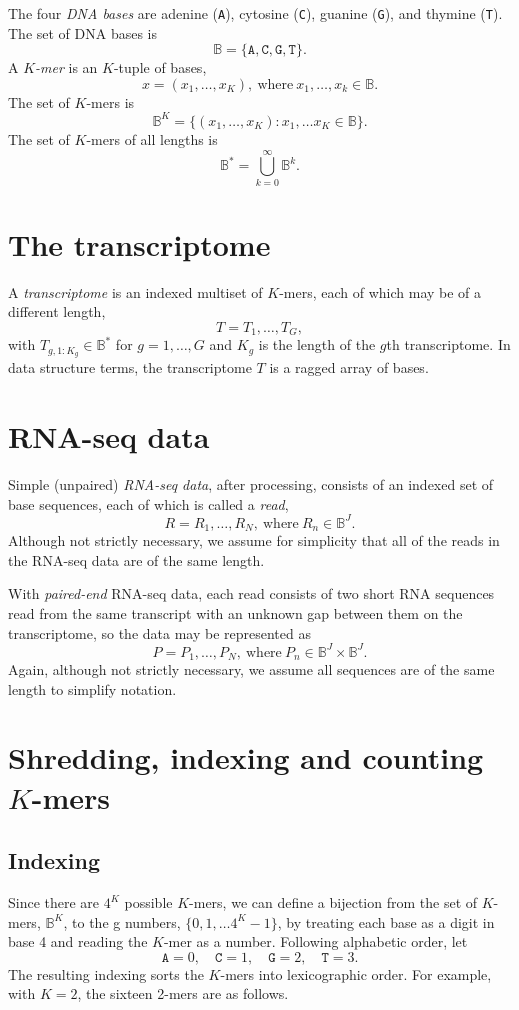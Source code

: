 \documentclass[11pt]{article}
\begin{document}
The four \emph{DNA bases} are adenine (\texttt{A}),
cytosine (\texttt{C}), guanine (\texttt{G}), and thymine (\texttt{T}).
The set of DNA bases is
\[
  \mathbb{B} = \{ \texttt{A}, \texttt{C}, \texttt{G}, \texttt{T} \}.
\]
A \emph{$K$-mer} is an $K$-tuple of bases,
\[
  x = (x_1, \ldots, x_K),
  \ \textrm{where}
  \ x_1, \ldots, x_k \in \mathbb{B}.
\]
The set of $K$-mers is
\[
  \mathbb{B}^K
  = \{ (x_1, \ldots, x_K)
      : x_1, \ldots x_K \in \mathbb{B} \}.
\]
The set of $K$-mers of all lengths is
\[
  \mathbb{B}^* = \bigcup_{k=0}^{\infty} \mathbb{B}^k.
\]

\section{The transcriptome}

A \emph{transcriptome} is an indexed multiset of $K$-mers, each of
which may be of a different length,
\[
  T = T_{1}, \ldots, T_{G},
\]
with $T_{g, 1:K_g} \in \mathbb{B}^*$ for $g =1, \ldots, G$ and $K_g$ is the length of the $g$th transcriptome.  In data structure terms, the
transcriptome $T$ is a ragged array of bases.


\section{RNA-seq data}

Simple (unpaired) \emph{RNA-seq data}, after processing, consists of an indexed set of base
sequences, each of which is called a \emph{read},
\[
  R = R_1, \ldots, R_N, \ \textrm{where} \ R_n \in \mathbb{B}^J.
\]
Although not strictly necessary, we assume for simplicity that all of
the reads in the RNA-seq data are of the same length.

With \emph{paired-end} RNA-seq data, each read consists of two short RNA
sequences read from the same transcript with an unknown gap between
them on the transcriptome, so the data may be represented as
\[
  P = P_1, \ldots, P_N, \ \textrm{where} \ P_n \in \mathbb{B}^J \times
  \mathbb{B}^J.
\]
Again, although not strictly necessary, we assume all sequences are of
the same length to simplify notation.


\section{Shredding, indexing and counting $K$-mers}



\subsection{Indexing}
Since there are $4^K$ possible $K$-mers, we can 
define a bijection from the set of $K$-mers, $\mathbb{B}^K$, to the
g numbers, $\{ 0, 1, \ldots 4^K-1 \}$,
by treating each base as a digit in base 4 and reading the
$K$-mer as a number.  Following alphabetic order, let
\[
  \texttt{A} = 0,
  \quad \texttt{C} = 1,
  \quad \texttt{G} = 2,
  \quad \texttt{T} = 3.
\]
The resulting indexing sorts the $K$-mers into lexicographic order.
For example, with $K = 2$, the sixteen 2-mers are as follows.
\end{document}
